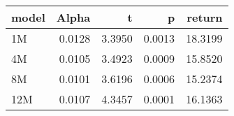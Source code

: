 \begin{table}[ht]
\centering
\begin{tabular}{lrrrr}
  \hline
model & Alpha & t & p & return \\ 
  \hline
1M & 0.0128 & 3.3950 & 0.0013 & 18.3199 \\ 
  4M & 0.0105 & 3.4923 & 0.0009 & 15.8520 \\ 
  8M & 0.0101 & 3.6196 & 0.0006 & 15.2374 \\ 
  12M & 0.0107 & 4.3457 & 0.0001 & 16.1363 \\ 
   \hline
\end{tabular}
\end{table}


